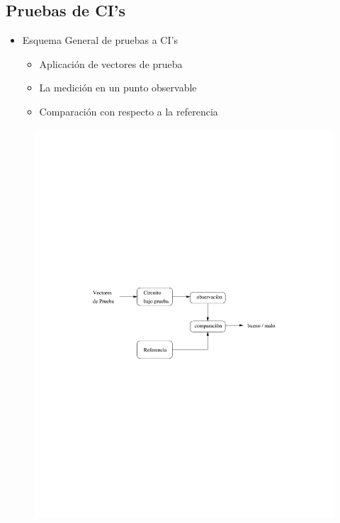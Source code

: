 \documentclass[
paper=128mm:96mm, %
fontsize=11pt, %
pagesize, %
parskip=half-, %
]{scrartcl} %
\theoremstyle{mythmstyle} %
\begin{document}
\clearpage


\subsection{Pruebas de CI's}

\begin{multicols}{2} %
  \begin{itemize}
  \item Esquema General de pruebas a CI's
    \begin{itemize}
    \item  Aplicación de vectores de prueba
    \item La medición en un punto observable
    \item Comparación con respecto a la referencia
    \end{itemize}
  \end{itemize}
\end{multicols}

\begin{figure}[h]
\centering\includegraphics[width=0.6\linewidth]{esquema}
\end{figure}

\end{document}
